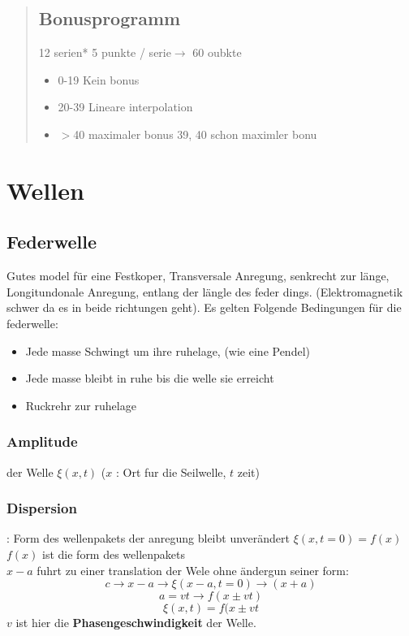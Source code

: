 \documentclass{article}
\author{Benjamin Dropmann}
\begin{document}
\begin{abstract}
\subsection{Bonusprogramm}
12 serien* 5 punkte / serie$\rightarrow$ 60 oubkte\begin{itemize}
\item[\textbullet]{0-19 Kein bonus}
\item[\textbullet]{20-39 Lineare interpolation}
\item[\textbullet]{$>$40 maximaler bonus 39, 40 schon maximler bonu}
\end{itemize}
\end{abstract}
\section{Wellen}
\subsection{Federwelle} Gutes model für eine Festkoper, Transversale Anregung, senkrecht zur länge, Longitundonale Anregung, entlang der  längle des feder dings. (Elektromagnetik schwer da es in beide richtungen geht). Es gelten Folgende Bedingungen für die federwelle:
\begin{itemize}
\item[\textbullet]Jede masse Schwingt um ihre ruhelage, (wie eine Pendel)
\item[\textbullet]Jede masse bleibt in ruhe bis die welle sie erreicht
\item[\textbullet]Ruckrehr zur ruhelage
\end{itemize}
\subsubsection{Amplitude} der Welle $\xi(x,t)$ ($x$ : Ort fur die Seilwelle, $t$ zeit)
\subsubsection{Dispersion}: Form des wellenpakets der anregung bleibt unverändert
$\xi(x,t=0)=f(x)$ $f(x)$ ist die form des wellenpakets\\$x-a$ fuhrt zu einer translation der Wele ohne ändergun seiner form:
\[c\rightarrow x-a\rightarrow \xi(x-a,t=0)\rightarrow (x+a)\]
\[a=vt \rightarrow f(x\pm vt)\]
\[\xi(x,t)=f(x\pm vt\] $v$ ist hier die \textbf{Phasengeschwindigkeit} der Welle.
\end{document}
